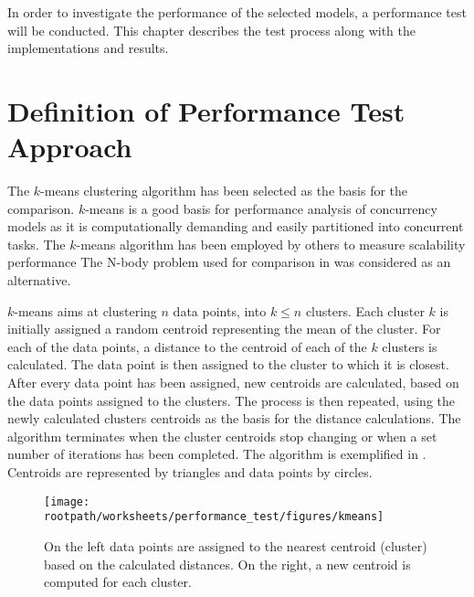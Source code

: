 \makeatletter {}\makeatother
{}

In order to investigate the performance of the selected models, a performance test will be conducted. This chapter describes the test process along with the implementations and results. 
\label{chap:performance}
\section{Definition of Performance Test Approach}
The $k$-means clustering algorithm has been selected as the basis for the comparison. $k$-means is a good basis for performance analysis of concurrency models as it is computationally demanding and easily partitioned into concurrent tasks\cite[p. 128]{epstein2011towards}. The $k$-means algorithm has been employed by others to measure scalability performance\cite{epstein2011towards}\cite{tardieu2014x10} The N-body problem used for comparison in \cite{totoo2012haskell} was considered as an alternative.

$k$-means aims at clustering $n$ data points, into $k \leq n$ clusters\cite[p. 451]{dataminingconceptsandtechniques}\cite[p. 128]{epstein2011towards}. Each cluster $k$ is initially assigned a random centroid representing the mean of the cluster. For each of the data points, a distance to the centroid of each of the $k$ clusters is calculated. The data point is then assigned to the cluster to which it is closest. After every data point has been assigned, new centroids are calculated, based on the data points assigned to the clusters. The process is then repeated, using the newly calculated clusters centroids as the basis for the distance calculations. The algorithm terminates when the cluster centroids stop changing or when a set number of iterations has been completed\cite[p. 128]{epstein2011towards}. The algorithm is exemplified in . Centroids are represented by triangles and data points by circles.

\begin{figure}[ht!]
\centering
\texttt{[image: \\rootpath/worksheets/performance\_test/figures/kmeans]}
\caption{On the left data points are assigned to the nearest centroid (cluster) based on the calculated distances. On the right, a new centroid is computed for each cluster.}\label{fig:kmeans}
\end{figure}

